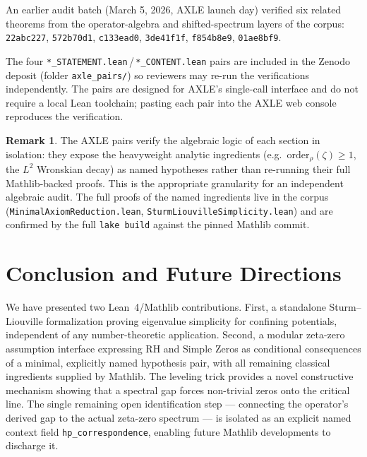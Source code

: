\documentclass[12pt, a4paper]{article}
\theoremstyle{plain}
\theoremstyle{definition}
\newtheorem{remark}[theorem]{Remark}
\newcommand{\lean}[1]{\texttt{#1}}
\begin{document}
An earlier audit batch (March 5, 2026, AXLE launch day) verified six
related theorems from the operator-algebra and shifted-spectrum layers
of the corpus:
\texttt{22abc227}, \texttt{572b70d1}, \texttt{c133ead0},
\texttt{3de41f1f}, \texttt{f854b8e9}, \texttt{01ae8bf9}.

The four \texttt{*\_STATEMENT.lean}\,/\,\texttt{*\_CONTENT.lean} pairs
are included in the Zenodo deposit (folder \texttt{axle\_pairs/}) so
reviewers may re-run the verifications independently.
The pairs are designed for AXLE's single-call interface and do not
require a local Lean toolchain; pasting each pair into the AXLE web
console reproduces the verification.

\begin{remark}
The AXLE pairs verify the algebraic logic of each section in
isolation: they expose the heavyweight analytic ingredients (e.g.\
$\mathrm{order}_\rho(\zeta) \geq 1$, the $L^2$ Wronskian decay) as
named hypotheses rather than re-running their full Mathlib-backed
proofs.
This is the appropriate granularity for an independent algebraic
audit.
The full proofs of the named ingredients live in the corpus
(\lean{MinimalAxiomReduction.lean}, \lean{SturmLiouvilleSimplicity.lean})
and are confirmed by the full \texttt{lake build} against the pinned
Mathlib commit.
\end{remark}

\section{Conclusion and Future Directions}
\label{sec:conclusion}

We have presented two Lean~4/Mathlib contributions.
First, a standalone Sturm--Liouville formalization proving eigenvalue simplicity
for confining potentials, independent of any number-theoretic application.
Second, a modular zeta-zero assumption interface expressing RH and Simple Zeros
as conditional consequences of a minimal, explicitly named hypothesis pair,
with all remaining classical ingredients supplied by Mathlib.
The leveling trick provides a novel constructive mechanism showing that a
spectral gap forces non-trivial zeros onto the critical line.
The single remaining open identification step --- connecting the operator's
derived gap to the actual zeta-zero spectrum --- is isolated as an explicit
named context field \lean{hp\_correspondence}, enabling future Mathlib
developments to discharge it.
\end{document}
